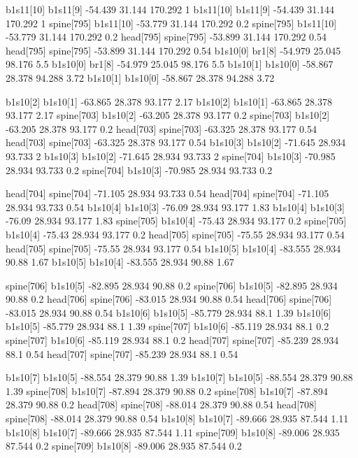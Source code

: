 b1s11[10]    b1s11[9]    -54.439    31.144    170.292    1
b1s11[10]    b1s11[9]    -54.439    31.144    170.292    1
spine[795]    b1s11[10]    -53.779    31.144    170.292    0.2
spine[795]    b1s11[10]    -53.779    31.144    170.292    0.2
head[795]    spine[795]    -53.899    31.144    170.292    0.54
head[795]    spine[795]    -53.899    31.144    170.292    0.54
b1s10[0]    br1[8]    -54.979    25.045    98.176    5.5
b1s10[0]    br1[8]    -54.979    25.045    98.176    5.5
b1s10[1]    b1s10[0]    -58.867    28.378    94.288    3.72
b1s10[1]    b1s10[0]    -58.867    28.378    94.288    3.72


b1s10[2]    b1s10[1]    -63.865    28.378    93.177    2.17
b1s10[2]    b1s10[1]    -63.865    28.378    93.177    2.17
spine[703]    b1s10[2]    -63.205    28.378    93.177    0.2
spine[703]    b1s10[2]    -63.205    28.378    93.177    0.2
head[703]    spine[703]    -63.325    28.378    93.177    0.54
head[703]    spine[703]    -63.325    28.378    93.177    0.54
b1s10[3]    b1s10[2]    -71.645    28.934    93.733    2
b1s10[3]    b1s10[2]    -71.645    28.934    93.733    2
spine[704]    b1s10[3]    -70.985    28.934    93.733    0.2
spine[704]    b1s10[3]    -70.985    28.934    93.733    0.2


head[704]    spine[704]    -71.105    28.934    93.733    0.54
head[704]    spine[704]    -71.105    28.934    93.733    0.54
b1s10[4]    b1s10[3]    -76.09    28.934    93.177    1.83
b1s10[4]    b1s10[3]    -76.09    28.934    93.177    1.83
spine[705]    b1s10[4]    -75.43    28.934    93.177    0.2
spine[705]    b1s10[4]    -75.43    28.934    93.177    0.2
head[705]    spine[705]    -75.55    28.934    93.177    0.54
head[705]    spine[705]    -75.55    28.934    93.177    0.54
b1s10[5]    b1s10[4]    -83.555    28.934    90.88    1.67
b1s10[5]    b1s10[4]    -83.555    28.934    90.88    1.67


spine[706]    b1s10[5]    -82.895    28.934    90.88    0.2
spine[706]    b1s10[5]    -82.895    28.934    90.88    0.2
head[706]    spine[706]    -83.015    28.934    90.88    0.54
head[706]    spine[706]    -83.015    28.934    90.88    0.54
b1s10[6]    b1s10[5]    -85.779    28.934    88.1    1.39
b1s10[6]    b1s10[5]    -85.779    28.934    88.1    1.39
spine[707]    b1s10[6]    -85.119    28.934    88.1    0.2
spine[707]    b1s10[6]    -85.119    28.934    88.1    0.2
head[707]    spine[707]    -85.239    28.934    88.1    0.54
head[707]    spine[707]    -85.239    28.934    88.1    0.54


b1s10[7]    b1s10[5]    -88.554    28.379    90.88    1.39
b1s10[7]    b1s10[5]    -88.554    28.379    90.88    1.39
spine[708]    b1s10[7]    -87.894    28.379    90.88    0.2
spine[708]    b1s10[7]    -87.894    28.379    90.88    0.2
head[708]    spine[708]    -88.014    28.379    90.88    0.54
head[708]    spine[708]    -88.014    28.379    90.88    0.54
b1s10[8]    b1s10[7]    -89.666    28.935    87.544    1.11
b1s10[8]    b1s10[7]    -89.666    28.935    87.544    1.11
spine[709]    b1s10[8]    -89.006    28.935    87.544    0.2
spine[709]    b1s10[8]    -89.006    28.935    87.544    0.2


